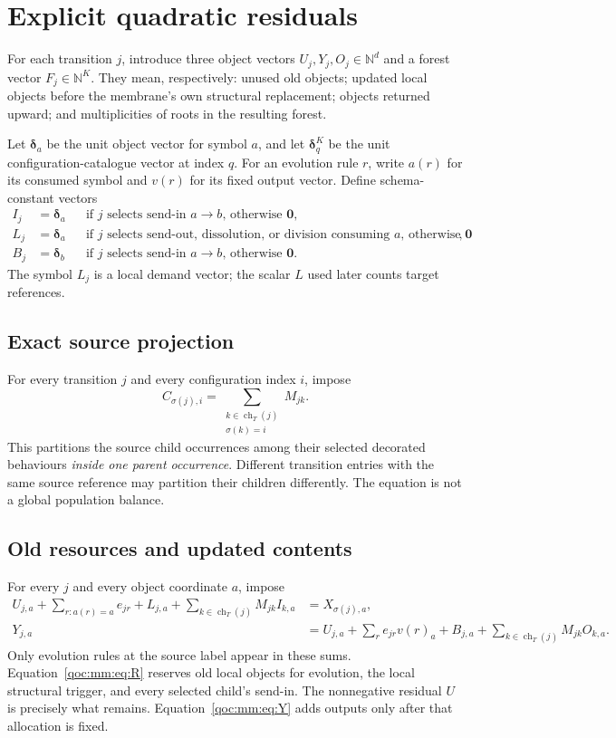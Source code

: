 \documentclass[11pt,letterpaper]{article}
\theoremstyle{definition}
\theoremstyle{remark}
\newcommand{\N}{\mathbb N}
\newcommand{\ch}{\operatorname{ch}}
\newcommand{\ee}{\boldsymbol\delta}
\newcommand{\mmzero}{\boldsymbol 0}
\begin{document}
\section{Explicit quadratic residuals}\label{qoc:mm:sec:equations}
For each transition $j$, introduce three object vectors $U_j,Y_j,O_j\in\N^d$ and a forest vector $F_j\in\N^K$. They mean, respectively: unused old objects; updated local objects before the membrane's own structural replacement; objects returned upward; and multiplicities of roots in the resulting forest.

Let $\ee_a$ be the unit object vector for symbol $a$, and let $\ee_q^K$ be the unit configuration-catalogue vector at index $q$. For an evolution rule $r$, write $a(r)$ for its consumed symbol and $v(r)$ for its fixed output vector. Define schema-constant vectors
\begin{align*}
 I_j&=\ee_a &&\text{if $j$ selects send-in $a\to b$, otherwise $\mmzero$},\\
 L_j&=\ee_a &&\text{if $j$ selects send-out, dissolution, or division consuming $a$, otherwise $\mmzero$},\\
 B_j&=\ee_b &&\text{if $j$ selects send-in $a\to b$, otherwise $\mmzero$}.
\end{align*}
The symbol $L_j$ is a local demand vector; the scalar $L$ used later counts target references.

\subsection{Exact source projection}
For every transition $j$ and every configuration index $i$, impose
\begin{equation}\tag{S}\label{qoc:mm:eq:S}
 C_{\sigma(j),i}=\sum_{\substack{k\in\ch_T(j)\\\sigma(k)=i}}M_{jk}.
\end{equation}
This partitions the source child occurrences among their selected decorated behaviours \emph{inside one parent occurrence}. Different transition entries with the same source reference may partition their children differently. The equation is not a global population balance.

\subsection{Old resources and updated contents}
For every $j$ and every object coordinate $a$, impose
\begin{align}
 U_{j,a}+\sum_{r:a(r)=a}e_{jr}+L_{j,a}
  +\sum_{k\in\ch_T(j)}M_{jk}I_{k,a}
 &=X_{\sigma(j),a},\tag{R}\label{qoc:mm:eq:R}\\
 Y_{j,a}&=U_{j,a}+\sum_r e_{jr}v(r)_a+B_{j,a}
  +\sum_{k\in\ch_T(j)}M_{jk}O_{k,a}.\tag{Y}\label{qoc:mm:eq:Y}
\end{align}
Only evolution rules at the source label appear in these sums. Equation~\eqref{qoc:mm:eq:R} reserves old local objects for evolution, the local structural trigger, and every selected child's send-in. The nonnegative residual $U$ is precisely what remains. Equation~\eqref{qoc:mm:eq:Y} adds outputs only after that allocation is fixed.
\end{document}
